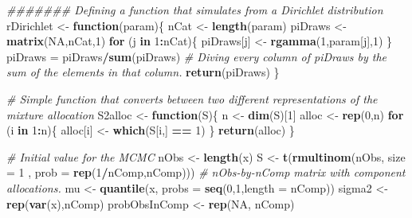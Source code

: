 \documentclass[]{article}
\newenvironment{Shaded}{\begin{snugshade}}{\end{snugshade}}
\newcommand{\CommentTok}[1]{\textcolor[rgb]{0.56,0.35,0.01}{\textit{#1}}}
\newcommand{\ControlFlowTok}[1]{\textcolor[rgb]{0.13,0.29,0.53}{\textbf{#1}}}
\newcommand{\DataTypeTok}[1]{\textcolor[rgb]{0.13,0.29,0.53}{#1}}
\newcommand{\DecValTok}[1]{\textcolor[rgb]{0.00,0.00,0.81}{#1}}
\newcommand{\KeywordTok}[1]{\textcolor[rgb]{0.13,0.29,0.53}{\textbf{#1}}}
\newcommand{\NormalTok}[1]{#1}
\newcommand{\OperatorTok}[1]{\textcolor[rgb]{0.81,0.36,0.00}{\textbf{#1}}}
\newcommand{\OtherTok}[1]{\textcolor[rgb]{0.56,0.35,0.01}{#1}}
\newcommand{\StringTok}[1]{\textcolor[rgb]{0.31,0.60,0.02}{#1}}
\begin{document}
\begin{Shaded}
\begin{Highlighting}[]
\CommentTok{\#\#\#\#\#\#\# Defining a function that simulates from a Dirichlet distribution}
\NormalTok{rDirichlet \textless{}{-}}\StringTok{ }\ControlFlowTok{function}\NormalTok{(param)\{}
\NormalTok{  nCat \textless{}{-}}\StringTok{ }\KeywordTok{length}\NormalTok{(param)}
\NormalTok{  piDraws \textless{}{-}}\StringTok{ }\KeywordTok{matrix}\NormalTok{(}\OtherTok{NA}\NormalTok{,nCat,}\DecValTok{1}\NormalTok{)}
  \ControlFlowTok{for}\NormalTok{ (j }\ControlFlowTok{in} \DecValTok{1}\OperatorTok{:}\NormalTok{nCat)\{}
\NormalTok{    piDraws[j] \textless{}{-}}\StringTok{ }\KeywordTok{rgamma}\NormalTok{(}\DecValTok{1}\NormalTok{,param[j],}\DecValTok{1}\NormalTok{)}
\NormalTok{  \}}
\NormalTok{  piDraws =}\StringTok{ }\NormalTok{piDraws}\OperatorTok{/}\KeywordTok{sum}\NormalTok{(piDraws) }\CommentTok{\# Diving every column of piDraws by the sum of the elements in that column.}
  \KeywordTok{return}\NormalTok{(piDraws)}
\NormalTok{\}}

\CommentTok{\# Simple function that converts between two different representations of the mixture allocation}
\NormalTok{S2alloc \textless{}{-}}\StringTok{ }\ControlFlowTok{function}\NormalTok{(S)\{}
\NormalTok{  n \textless{}{-}}\StringTok{ }\KeywordTok{dim}\NormalTok{(S)[}\DecValTok{1}\NormalTok{]}
\NormalTok{  alloc \textless{}{-}}\StringTok{ }\KeywordTok{rep}\NormalTok{(}\DecValTok{0}\NormalTok{,n)}
  \ControlFlowTok{for}\NormalTok{ (i }\ControlFlowTok{in} \DecValTok{1}\OperatorTok{:}\NormalTok{n)\{}
\NormalTok{    alloc[i] \textless{}{-}}\StringTok{ }\KeywordTok{which}\NormalTok{(S[i,] }\OperatorTok{==}\StringTok{ }\DecValTok{1}\NormalTok{)}
\NormalTok{  \}}
  \KeywordTok{return}\NormalTok{(alloc)}
\NormalTok{\}}

\CommentTok{\# Initial value for the MCMC}
\NormalTok{nObs \textless{}{-}}\StringTok{ }\KeywordTok{length}\NormalTok{(x)}
\NormalTok{S \textless{}{-}}\StringTok{ }\KeywordTok{t}\NormalTok{(}\KeywordTok{rmultinom}\NormalTok{(nObs, }\DataTypeTok{size =} \DecValTok{1}\NormalTok{ , }\DataTypeTok{prob =} \KeywordTok{rep}\NormalTok{(}\DecValTok{1}\OperatorTok{/}\NormalTok{nComp,nComp))) }\CommentTok{\# nObs{-}by{-}nComp matrix with component allocations.}
\NormalTok{mu \textless{}{-}}\StringTok{ }\KeywordTok{quantile}\NormalTok{(x, }\DataTypeTok{probs =} \KeywordTok{seq}\NormalTok{(}\DecValTok{0}\NormalTok{,}\DecValTok{1}\NormalTok{,}\DataTypeTok{length =}\NormalTok{ nComp))}
\NormalTok{sigma2 \textless{}{-}}\StringTok{ }\KeywordTok{rep}\NormalTok{(}\KeywordTok{var}\NormalTok{(x),nComp)}
\NormalTok{probObsInComp \textless{}{-}}\StringTok{ }\KeywordTok{rep}\NormalTok{(}\OtherTok{NA}\NormalTok{, nComp)}


\end{Highlighting}
\end{Shaded}
\end{document}
